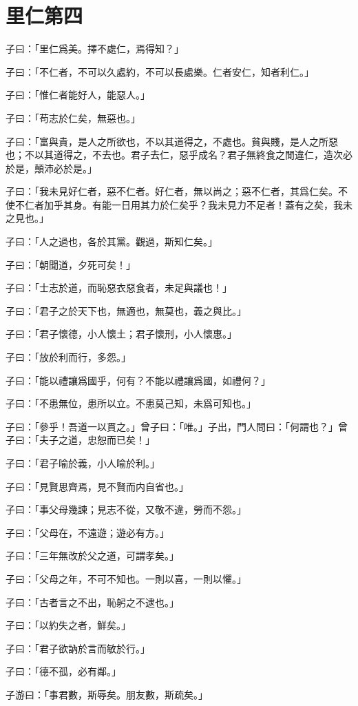 \section[里仁第四]{里仁第四}

子曰：「里仁爲美。擇不處仁，焉得知？」

子曰：「不仁者，不可以久處約，不可以長處樂。仁者安仁，知者利仁。」

子曰：「惟仁者能好人，能惡人。」

子曰：「苟志於仁矣，無惡也。」

子曰：「富與貴，是人之所欲也，不以其道得之，不處也。貧與賤，是人之所惡也；不以其道得之，不去也。君子去仁，惡乎成名？君子無終食之閒違仁，造次必於是，顛沛必於是。」

子曰：「我未見好仁者，惡不仁者。好仁者，無以尚之；惡不仁者，其爲仁矣。不使不仁者加乎其身。有能一日用其力於仁矣乎？我未見力不足者！蓋有之矣，我未之見也。」

子曰：「人之過也，各於其黨。觀過，斯知仁矣。」

子曰：「朝聞道，夕死可矣！」

子曰：「士志於道，而恥惡衣惡食者，未足與議也！」

子曰：「君子之於天下也，無適也，無莫也，義之與比。」

子曰：「君子懷德，小人懷土；君子懷刑，小人懷惠。」

子曰：「放於利而行，多怨。」

子曰：「能以禮讓爲國乎，何有？不能以禮讓爲國，如禮何？」

子曰：「不患無位，患所以立。不患莫己知，未爲可知也。」

子曰：「參乎！吾道一以貫之。」曾子曰：「唯。」子出，門人問曰：「何謂也？」曾子曰：「夫子之道，忠恕而已矣！」

子曰：「君子喻於義，小人喻於利。」

子曰：「見賢思齊焉，見不賢而内自省也。」

子曰：「事父母幾諫；見志不從，又敬不違，勞而不怨。」

子曰：「父母在，不遠遊；遊必有方。」

子曰：「三年無改於父之道，可謂孝矣。」

子曰：「父母之年，不可不知也。一則以喜，一則以懼。」

子曰：「古者言之不出，恥躬之不逮也。」

子曰：「以約失之者，鮮矣。」

子曰：「君子欲訥於言而敏於行。」

子曰：「德不孤，必有鄰。」

子游曰：「事君數，斯辱矣。朋友數，斯疏矣。」
